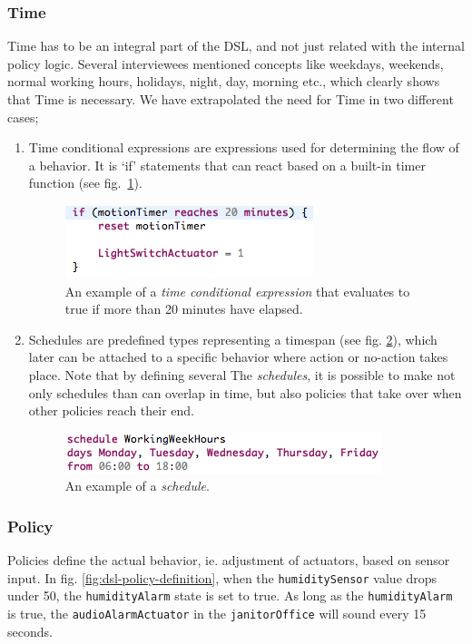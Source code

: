 \subsubsection{Time}\label{subsec:time}
Time has to be an integral part of the DSL, and not just related with the internal policy logic. Several interviewees mentioned concepts like weekdays, weekends, normal working hours, holidays, night, day, morning etc., which clearly shows that Time is necessary. We have extrapolated the need for Time in two different cases;
\begin{enumerate}
	\item Time conditional expressions\label{subsubsec:conditionalexpression}
are expressions used for determining the flow of a behavior. It is `if' statements that can react based on a built-in timer function (see fig.~\ref{fig:dsl-conditionalexpression}).

\begin{figure}[h]
  \centering
    \includegraphics[scale=.5]{dsl-conditional-time-expression.png}
	\caption{An example of a \textit{time conditional expression} that evaluates to true if more than 20 minutes have elapsed.}
	\label{fig:dsl-conditionalexpression}
\end{figure}
\newpage
\item Schedules\label{subsubsec:schedules} are predefined types representing a timespan (see fig. \ref{fig:dsl-schedules}), which later can be attached to a specific behavior where action or no-action takes place. Note that by defining several The \textit{schedules}, it is possible to make not only schedules than can overlap in time, but also policies that take over when other policies reach their end.

\begin{figure}
  \centering
  \includegraphics[scale=.5]{dsl-schedules.png}
  \caption{An example of a \textit{schedule}.}
  \label{fig:dsl-schedules}
\end{figure}
\end{enumerate}

\subsubsection{Policy}\label{subsec:policies}
Policies define the actual behavior, ie. adjustment of actuators, based on sensor input. In fig. \ref{fig:dsl-policy-definition}, when the \texttt{humiditySensor} value drops under 50, the \texttt{humidityAlarm} state is set to true. As long as the \texttt{humidityAlarm} is true, the \texttt{audioAlarmActuator} in the \texttt{janitorOffice} will sound every 15 seconds.


